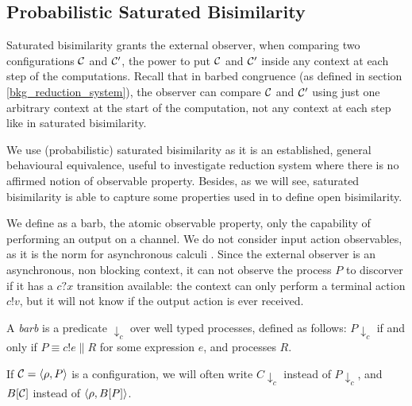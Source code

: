 \subsection{Probabilistic Saturated Bisimilarity}

Saturated bisimilarity \cite{bonchiGeneralTheoryBarbs2014} grants the external observer, when comparing two configurations $\mathcal{C}$ and $\mathcal{C}'$, the power to put $\mathcal{C}$ and $\mathcal{C}'$ inside any context at each step of the computations. Recall that in barbed congruence (as defined in section \ref{bkg_reduction_system}), the observer can compare $\mathcal{C}$ and $\mathcal{C}'$ using just one arbitrary context at the start of the computation, not any context at each step like in saturated bisimilarity.

We use (probabilistic) saturated bisimilarity as it is an established, general behavioural equivalence, useful to investigate reduction system where there is no affirmed notion of observable property. Besides, as we will see, saturated bisimilarity is able to capture some properties used in \cite{dengOpenBisimulationQuantum2012} to define open bisimilarity.


We define as a barb, the atomic observable property, only the capability of performing an output on a channel. We do not consider input action observables, as it is the norm for asynchronous calculi \cite{amadioBisimulationsAsynchronousPcalculus1998}. Since the external observer is an asynchronous, non blocking context, it can not observe the process $P$ to discorver if it has a $c?x$ transition available: the context can only perform a terminal action $c!v$, but it will not know if the output action is ever received.

\begin{definition}[Barb]
	A \emph{barb} is a predicate $\downarrow_{c}$ over well typed processes, defined as follows: $P \downarrow_{c}$ if and only if $P \equiv c!e \parallel R$ for some expression $e$, and processes $R$.
\end{definition}


If $\mathcal{C} = \langle\rho, P\rangle$ is a configuration, we will often write $C\downarrow_c$ instead of $P\downarrow_c$, and $B[\mathcal{C}]$ instead of $\langle\rho, B[P]\rangle$.

